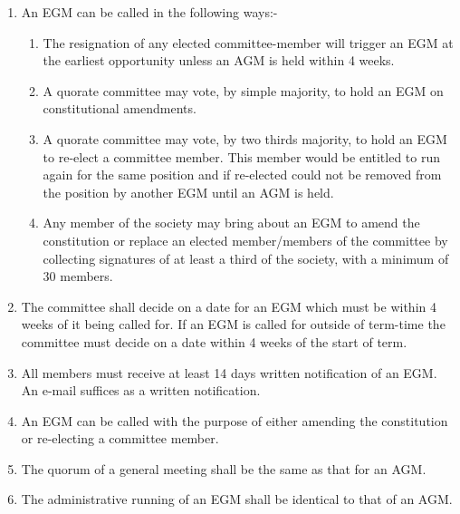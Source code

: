 \documentclass{article}
\begin{document}
\begin{enumerate}

  \item An EGM can be called in the following ways:-
    \begin {enumerate}
      \item The resignation of any elected committee-member will trigger an
        EGM at the earliest opportunity unless an AGM is held within 4
        weeks.
      \item A quorate committee may vote, by simple majority, to hold an EGM
        on constitutional amendments.
      \item A quorate committee may vote, by two thirds majority, to hold an
        EGM to re-elect a committee member. This member would be entitled
        to run again for the same position and if re-elected could not be
        removed from the position by another EGM until an AGM is held.
      \item Any member of the society may bring about an EGM to amend the
        constitution or replace an elected member/members of the committee
        by collecting signatures of at least a third of the society, with a
        minimum of 30 members.
    \end{enumerate}

  \item The committee shall decide on a date for an EGM which must be within
    4 weeks of it being called for. If an EGM is called for outside of term-time
    the committee must decide on a date within 4 weeks of the start of term.

  \item All members must receive at least 14 days written notification of an EGM.
    An e-mail suffices as a written notification.

  \item An EGM can be called with the purpose of either amending the constitution
    or re-electing a committee member.
  
  \item The quorum of a general meeting shall be the same as that for an AGM.

  \item The administrative running of an EGM shall be identical to that of an AGM.

\end{enumerate}
\end{document}
